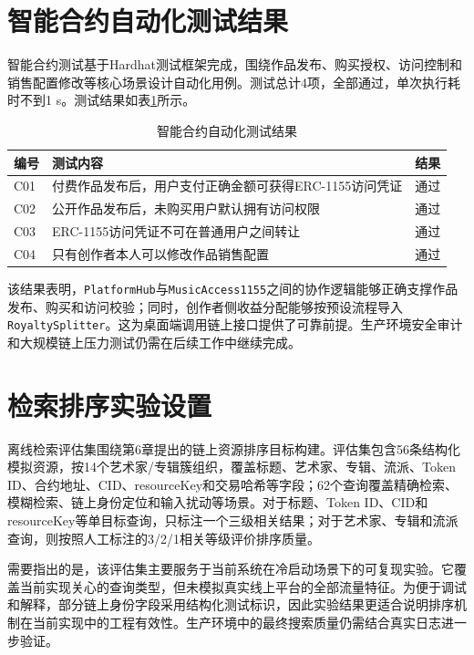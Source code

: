 \section{智能合约自动化测试结果}

智能合约测试基于Hardhat测试框架完成，围绕作品发布、购买授权、访问控制和销售配置修改等核心场景设计自动化用例。测试总计4项，全部通过，单次执行耗时不到1 s。测试结果如表\ref{tab:contract_tests}所示。

\begin{table}[htbp]
    \linespread{1.45}
    \songti
    \centering
    \caption{智能合约自动化测试结果}\label{tab:contract_tests}
    \begin{tabular}{|l|p{8.3cm}|l|}
        \hline
        编号  & 测试内容                            & 结果 \\ \hline
        C01 & 付费作品发布后，用户支付正确金额可获得ERC-1155访问凭证 & 通过 \\ \hline
        C02 & 公开作品发布后，未购买用户默认拥有访问权限           & 通过 \\ \hline
        C03 & ERC-1155访问凭证不可在普通用户之间转让         & 通过 \\ \hline
        C04 & 只有创作者本人可以修改作品销售配置               & 通过 \\ \hline
    \end{tabular}
\end{table}

该结果表明，\texttt{PlatformHub}与\texttt{MusicAccess1155}之间的协作逻辑能够正确支撑作品发布、购买和访问校验；同时，创作者侧收益分配能够按预设流程导入\texttt{RoyaltySplitter}。这为桌面端调用链上接口提供了可靠前提。生产环境安全审计和大规模链上压力测试仍需在后续工作中继续完成。


\section{检索排序实验设置}

离线检索评估集围绕第6章提出的链上资源排序目标构建。评估集包含56条结构化模拟资源，按14个艺术家/专辑簇组织，覆盖标题、艺术家、专辑、流派、Token ID、合约地址、CID、resourceKey和交易哈希等字段；62个查询覆盖精确检索、模糊检索、链上身份定位和输入扰动等场景。对于标题、Token ID、CID和resourceKey等单目标查询，只标注一个三级相关结果；对于艺术家、专辑和流派查询，则按照人工标注的3/2/1相关等级评价排序质量。

需要指出的是，该评估集主要服务于当前系统在冷启动场景下的可复现实验。它覆盖当前实现关心的查询类型，但未模拟真实线上平台的全部流量特征。为便于调试和解释，部分链上身份字段采用结构化测试标识，因此实验结果更适合说明排序机制在当前实现中的工程有效性。生产环境中的最终搜索质量仍需结合真实日志进一步验证。

